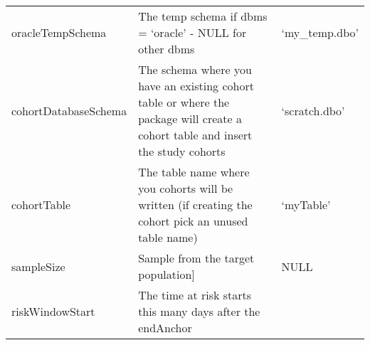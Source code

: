 \documentclass[
]{article}
\begin{document}
\begin{longtable}[]{@{}lll@{}}
\begin{minipage}[t]{0.21\columnwidth}
oracleTempSchema\strut
\end{minipage} & \begin{minipage}[t]{0.46\columnwidth}\raggedright
The temp schema if dbms = `oracle' - NULL for other dbms\strut
\end{minipage} & \begin{minipage}[t]{0.24\columnwidth}\raggedright
`my\_temp.dbo'\strut
\end{minipage}\tabularnewline
\begin{minipage}[t]{0.21\columnwidth}\raggedright
cohortDatabaseSchema\strut
\end{minipage} & \begin{minipage}[t]{0.46\columnwidth}\raggedright
The schema where you have an existing cohort table or where the package
will create a cohort table and insert the study cohorts\strut
\end{minipage} & \begin{minipage}[t]{0.24\columnwidth}\raggedright
`scratch.dbo'\strut
\end{minipage}\tabularnewline
\begin{minipage}[t]{0.21\columnwidth}\raggedright
cohortTable\strut
\end{minipage} & \begin{minipage}[t]{0.46\columnwidth}\raggedright
The table name where you cohorts will be written (if creating the cohort
pick an unused table name)\strut
\end{minipage} & \begin{minipage}[t]{0.24\columnwidth}\raggedright
`myTable'\strut
\end{minipage}\tabularnewline
\begin{minipage}[t]{0.21\columnwidth}\raggedright
sampleSize\strut
\end{minipage} & \begin{minipage}[t]{0.46\columnwidth}\raggedright
Sample from the target population{]}\strut
\end{minipage} & \begin{minipage}[t]{0.24\columnwidth}\raggedright
NULL\strut
\end{minipage}\tabularnewline
\begin{minipage}[t]{0.21\columnwidth}\raggedright
riskWindowStart\strut
\end{minipage} & \begin{minipage}[t]{0.46\columnwidth}\raggedright
The time at risk starts this many days after the endAnchor\strut
\end{minipage} & \begin{minipage}[t]{0.24\columnwidth}\raggedright

\end{minipage}
\end{longtable}
\end{document}
